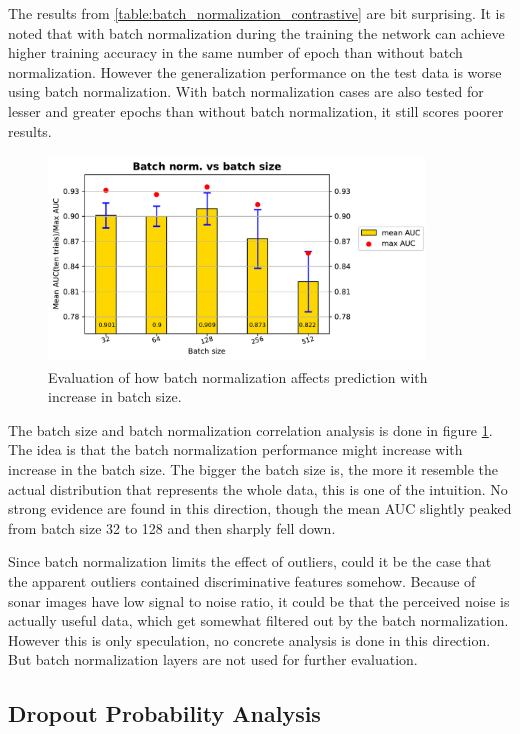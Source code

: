 The results from \ref{table:batch_normalization_contrastive} are bit surprising. It is noted that with batch normalization during the training the network can achieve higher training accuracy in the same number of epoch than without batch normalization. 
However the generalization performance on the test data is worse using batch normalization. With batch normalization cases are also tested for lesser and greater epochs than without batch normalization, it still scores poorer results.

\begin{figure}[ht]
\centering
\includegraphics[width=10cm,height= 5.5cm]{images/contrastive/contrastive_loss_bnvsbs_bar}
\caption{Evaluation of how batch normalization affects prediction with increase in batch size.}
\label{fig:contrastive_loss_bnvsbs_bar}
\end{figure}

The batch size and batch normalization correlation analysis is done in figure \ref{fig:contrastive_loss_bnvsbs_bar}. The idea is that the batch normalization performance might increase with increase in the batch size. The 
bigger the batch size is, the more it resemble the actual distribution that represents the whole data, this is one of the intuition. No strong evidence are found in this direction, though the mean AUC slightly peaked from 
batch size 32 to 128 and then sharply fell down.

Since batch normalization limits the effect of outliers, could it be the case that the apparent outliers contained discriminative features somehow. Because of sonar images 
have low signal to noise ratio, it could be that the perceived noise is actually useful data, which get somewhat filtered out by the batch normalization. However this is only speculation, no concrete analysis is done in this 
direction. But batch normalization layers are not used for further evaluation.

\subsection{Dropout Probability Analysis}

